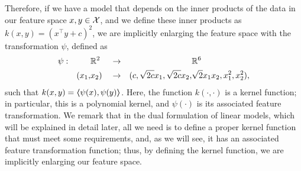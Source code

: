 %
Therefore, if we have a model that depends on the inner products of the data in our feature space $x, y \in \mathcal{X}$, and we define these inner products as $k(x, y) = (x^\intercal y + c)^2$, we are implicitly enlarging the feature space with the transformation $\psi$, defined as
\begin{equation}
    \begin{aligned}
        \nonumber
        \psi: & &&\mathbb{R}^2 & &\to& &\mathbb{R}^6 \\
        & &(x_1,& x_2)& &\to& (c, \sqrt{2c} x_1, \sqrt{2c} x_2,& \sqrt{2} x_1 x_2, x_1^2, x_2^2) ,
    \end{aligned}
\end{equation}
such that $k(x, y) = \bm{\left\langle} \psi(x), \psi(y) \bm{\right\rangle}$.
%
Here, the function $k(\cdot, \cdot)$ is a kernel function; in particular, this is a polynomial kernel, and $\psi(\cdot)$ is its associated feature transformation. 
We remark that in the dual formulation of linear models, which will be explained in detail later, all we need is to define a proper kernel function that must meet some requirements, and, as we will see, it has an associated feature transformation function; thus, by defining the kernel function, we are implicitly enlarging our feature space.





